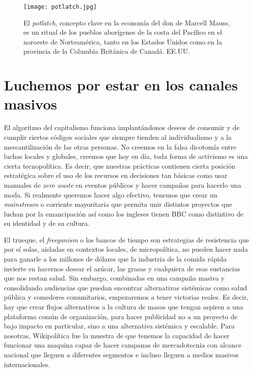 \begin{figure}[htbp]
	\centering
	\texttt{[image: potlatch.jpg]}
	\caption[\emph{Potlatch}.]{El \emph{potlatch}, concepto clave en la economía del don de Marcell Mauss, es un ritual de los pueblos aborígenes de la costa del Pacífico en el noroeste de Norteamérica, tanto en los Estados Unidos como en la provincia de la Columbia Británica de Canadá. EE.UU.}
	\label{fig:potlatch}
\end{figure}

\section{Luchemos por estar en los canales masivos}
\label{sec:luchemos}

El algoritmo del capitalismo funciona implantándonos deseos de consumir y de cumplir ciertos códigos sociales que siempre tienden al individualismo y a la mercantilización de las otras personas. No creemos en la falsa dicotomía entre luchas locales y globales, creemos que hoy en día, toda forma de activismo es una cierta tecnopolítica. Es decir, que nuestras prácticas contienen cierta posición estratégica sobre el uso de los recursos en decisiones tan básicas como usar manuales de \emph{zero waste} en eventos públicos y hacer campañas para hacerlo una moda. Si realmente queremos hacer algo efectivo, tenemos que crear un \emph{mainstream} o corriente mayoritaria que permita unir distintos proyectos que luchan por la emancipación así como los ingleses tienen BBC como distintivo de su identidad y de su cultura.

El trueque, el \emph{freeganism} o los bancos de tiempo son estrategias de resistencia que por sí solas, aisladas en contextos locales, de micropolítica, no pueden hacer nada para ganarle a los millones de dólares que la industria de la comida rápida invierte en hacernos desear el azúcar, las grasas y cualquiera de esas sustancias que nos restan salud. Sin embargo, combinadas en una campaña masiva y consolidando audiencias que puedan encontrar alternativas sistémicas como salud pública y comedores comunitarios, empezaremos a tener victorias reales. Es decir, hay que crear flujos alternativos a la cultura de masas que tengan aspiren a una plataforma común de organización, para hacer publicidad no a un proyecto de bajo impacto en particular, sino a una alternativa sistémica y escalable. Para nosotras, Wikipolítica fue la muestra de que tenemos la capacidad de hacer funcionar una maquina capaz de hacer campanas de mercadotecnia con alcance nacional que lleguen a diferentes segmentos e incluso lleguen a medios masivos internacionales.

